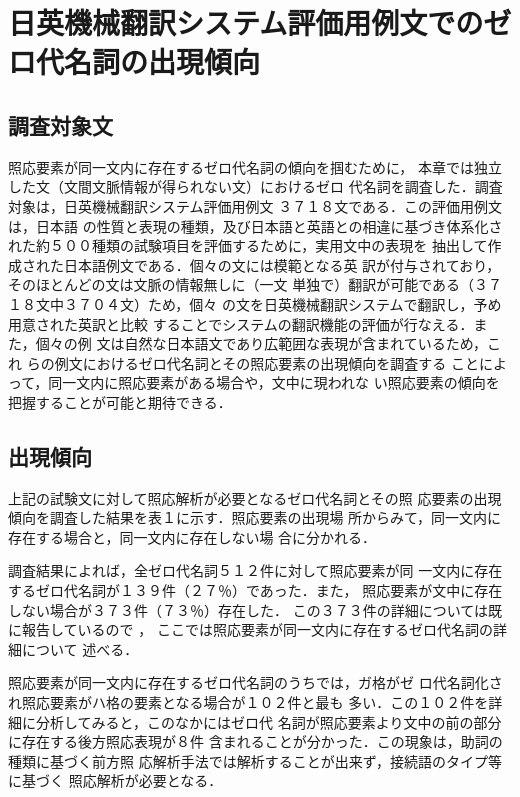 \section{日英機械翻訳システム評価用例文でのゼロ代名詞の出現傾向}
\subsection{調査対象文}
照応要素が同一文内に存在するゼロ代名詞の傾向を掴むために，
本章では独立した文（文間文脈情報が得られない文）におけるゼロ
代名詞を調査した．調査対象は，日英機械翻訳システム評価用例文
３７１８文\cite{IkeharaShirai1990}である．この評価用例文は，日本語
の性質と表現の種類，及び日本語と英語との相違に基づき体系化さ
れた約５００種類の試験項目を評価するために，実用文中の表現を
抽出して作成された日本語例文である．個々の文には模範となる英
訳が付与されており，そのほとんどの文は文脈の情報無しに（一文
単独で）翻訳が可能である（３７１８文中３７０４文）ため，個々
の文を日英機械翻訳システムで翻訳し，予め用意された英訳と比較
することでシステムの翻訳機能の評価が行なえる．また，個々の例
文は自然な日本語文であり広範囲な表現が含まれているため，これ
らの例文におけるゼロ代名詞とその照応要素の出現傾向を調査する
ことによって，同一文内に照応要素がある場合や，文中に現われな
い照応要素の傾向を把握することが可能と期待できる．

\subsection{出現傾向}

上記の試験文に対して照応解析が必要となるゼロ代名詞とその照
応要素の出現傾向を調査した結果を表１に示す．照応要素の出現場
所からみて，同一文内に存在する場合と，同一文内に存在しない場
合に分かれる．

調査結果によれば，全ゼロ代名詞５１２件に対して照応要素が同
一文内に存在するゼロ代名詞が１３９件（２７％）であった．また，
照応要素が文中に存在しない場合が３７３件（７３％）存在した．
この３７３件の詳細については既に報告しているので
\cite{NakaiwaShiraiIkehara1994,NakaiwaShiraiIkeharaKawaoka1995}，
ここでは照応要素が同一文内に存在するゼロ代名詞の詳細について
述べる．

照応要素が同一文内に存在するゼロ代名詞のうちでは，ガ格がゼ
ロ代名詞化され照応要素がハ格の要素となる場合が１０２件と最も
多い．この１０２件を詳細に分析してみると，このなかにはゼロ代
名詞が照応要素より文中の前の部分に存在する後方照応表現が８件
含まれることが分かった．この現象は，助詞の種類に基づく前方照
応解析手法では解析することが出来ず，接続語のタイプ等に基づく
照応解析が必要となる．

